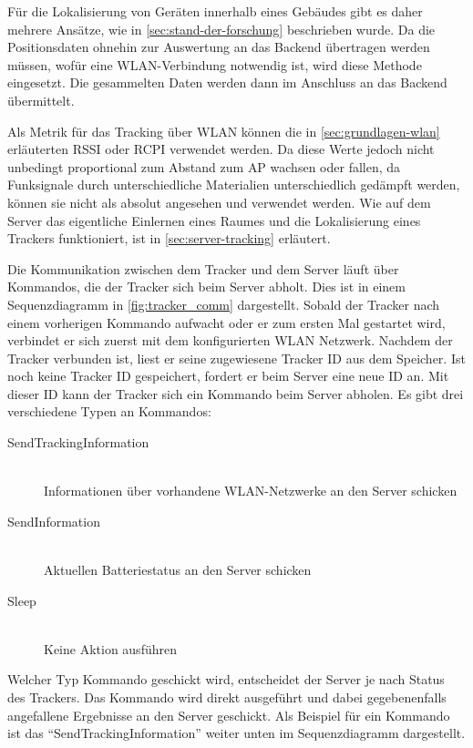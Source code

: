 Für die Lokalisierung von Geräten innerhalb eines Gebäudes gibt es daher mehrere Ansätze, wie in
\autoref{sec:stand-der-forschung} beschrieben wurde.
Da die Positionsdaten ohnehin zur Auswertung an das Backend übertragen werden müssen, wofür eine
\gls{WLAN}-Verbindung notwendig ist, wird diese Methode eingesetzt.
Die gesammelten Daten werden dann im Anschluss an das Backend übermittelt.

Als Metrik für das Tracking über \gls{WLAN} können die in \autoref{sec:grundlagen-wlan} erläuterten
\gls{RSSI} oder \gls{RCPI} verwendet werden. Da diese Werte jedoch nicht unbedingt proportional zum
Abstand zum \gls{AP} wachsen oder fallen, da Funksignale durch unterschiedliche Materialien
unterschiedlich gedämpft werden, können sie nicht als absolut angesehen und verwendet werden.
Wie auf dem Server das eigentliche Einlernen eines Raumes und die Lokalisierung eines Trackers funktioniert,
ist in \autoref{sec:server-tracking} erläutert.

Die Kommunikation zwischen dem Tracker und dem Server läuft über Kommandos, die der Tracker sich beim Server abholt.
Dies ist in einem Sequenzdiagramm in \autoref{fig:tracker_comm} dargestellt.
Sobald der Tracker nach einem vorherigen Kommando aufwacht oder er zum ersten Mal gestartet wird, verbindet er sich zuerst
mit dem konfigurierten \gls{WLAN} Netzwerk.
Nachdem der Tracker verbunden ist, liest er seine zugewiesene Tracker ID aus dem Speicher.
Ist noch keine Tracker ID gespeichert, fordert er beim Server eine neue ID an.
Mit dieser ID kann der Tracker sich ein Kommando beim Server abholen.
Es gibt drei verschiedene Typen an Kommandos:
\begin{description}
	\item[SendTrackingInformation] \hfill \\
		Informationen über vorhandene \gls{WLAN}-Netzwerke an den Server schicken
	\item[SendInformation] \hfill \\
		Aktuellen Batteriestatus an den Server schicken
	\item[Sleep] \hfill \\
		Keine Aktion ausführen
\end{description}
Welcher Typ Kommando geschickt wird, entscheidet der Server je nach Status des Trackers.
Das Kommando wird direkt ausgeführt und dabei gegebenenfalls angefallene Ergebnisse an den Server geschickt.
Als Beispiel für ein Kommando ist das \enquote{SendTrackingInformation} weiter unten im Sequenzdiagramm dargestellt.

